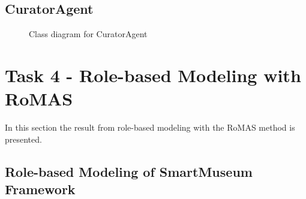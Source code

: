 \documentclass[paper=letter, fontsize=12pt]{article}
\begin{document}
\subsection{CuratorAgent}
\begin{figure}[H]
  \begin{center}
    \caption{Class diagram for CuratorAgent}
    \label{fig:curator_class}
  \end{center}
\end{figure}

\section{Task 4 - Role-based Modeling with RoMAS}
In this section the result from role-based modeling with the RoMAS \citep{romas} method is presented.
\subsection{Role-based Modeling of SmartMuseum Framework}
\end{document}
